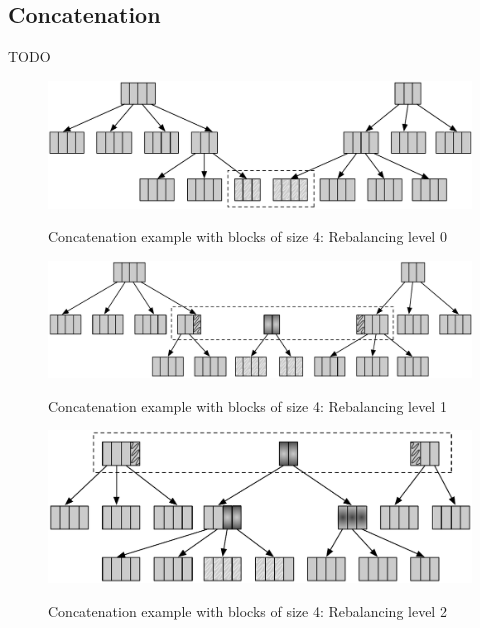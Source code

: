 \subsection{Concatenation}

\color{red} TODO \color{black}

\begin{figure}[h!]
  \centering
  \includegraphics[width=\textwidth]{Figures/Concat0.pdf}
  \label{Concat0Benchmarks}
  \caption{Concatenation example with blocks of size 4: Rebalancing level 0}
\end{figure}

\begin{figure}[h!]
  \centering
  \includegraphics[width=\textwidth]{Figures/Concat1.pdf}
  \label{Concat1Benchmarks}
  \caption{Concatenation example with blocks of size 4: Rebalancing level 1}
\end{figure}

\begin{figure}[h!]
  \centering
  \includegraphics[width=\textwidth]{Figures/Concat2.pdf}
  \label{Concat2Benchmarks}
  \caption{Concatenation example with blocks of size 4: Rebalancing level 2}
\end{figure}

